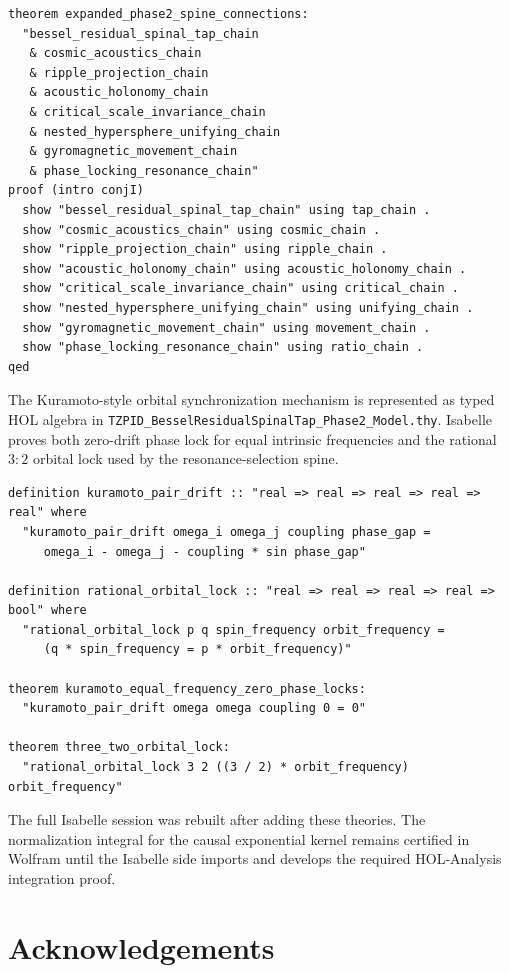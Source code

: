 \documentclass[11pt,a4paper]{article}
\begin{document}
\begin{lstlisting}
theorem expanded_phase2_spine_connections:
  "bessel_residual_spinal_tap_chain
   & cosmic_acoustics_chain
   & ripple_projection_chain
   & acoustic_holonomy_chain
   & critical_scale_invariance_chain
   & nested_hypersphere_unifying_chain
   & gyromagnetic_movement_chain
   & phase_locking_resonance_chain"
proof (intro conjI)
  show "bessel_residual_spinal_tap_chain" using tap_chain .
  show "cosmic_acoustics_chain" using cosmic_chain .
  show "ripple_projection_chain" using ripple_chain .
  show "acoustic_holonomy_chain" using acoustic_holonomy_chain .
  show "critical_scale_invariance_chain" using critical_chain .
  show "nested_hypersphere_unifying_chain" using unifying_chain .
  show "gyromagnetic_movement_chain" using movement_chain .
  show "phase_locking_resonance_chain" using ratio_chain .
qed
\end{lstlisting}

The Kuramoto-style orbital synchronization mechanism is represented as typed HOL algebra in \texttt{TZPID\_BesselResidualSpinalTap\_Phase2\_Model.thy}. Isabelle proves both zero-drift phase lock for equal intrinsic frequencies and the rational $3{:}2$ orbital lock used by the resonance-selection spine.

\begin{lstlisting}
definition kuramoto_pair_drift :: "real => real => real => real => real" where
  "kuramoto_pair_drift omega_i omega_j coupling phase_gap =
     omega_i - omega_j - coupling * sin phase_gap"

definition rational_orbital_lock :: "real => real => real => real => bool" where
  "rational_orbital_lock p q spin_frequency orbit_frequency =
     (q * spin_frequency = p * orbit_frequency)"

theorem kuramoto_equal_frequency_zero_phase_locks:
  "kuramoto_pair_drift omega omega coupling 0 = 0"

theorem three_two_orbital_lock:
  "rational_orbital_lock 3 2 ((3 / 2) * orbit_frequency) orbit_frequency"
\end{lstlisting}

The full Isabelle session was rebuilt after adding these theories. The normalization integral for the causal exponential kernel remains certified in Wolfram until the Isabelle side imports and develops the required HOL-Analysis integration proof.

\section*{Acknowledgements}
\end{document}
